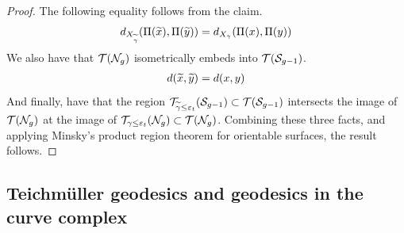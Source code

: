 \documentclass[12pt, reqno]{amsart}
\begin{document}
\begin{proof}
  The following equality follows from the claim.
  \begin{align*}
    d_{X_{\widetilde{\gamma}}}(\Pi(\widetilde{x}), \Pi(\widetilde{y})) = d_{X_{{\gamma}}}(\Pi({x}), \Pi({y}))
  \end{align*}
  We also have that $\mathcal{T}(\mathcal{N}_g)$ isometrically embeds into $\mathcal{T}(\mathcal{S}_{g-1})$.
  \begin{align*}
    d(\widetilde{x}, \widetilde{y}) = d(x, y)
  \end{align*}
  And finally, have that the region $\mathcal{T}_{\widetilde{\gamma} \leq \varepsilon_t}(\mathcal{S}_{g-1}) \subset \mathcal{T}(\mathcal{S}_{g-1})$ intersects the image of $\mathcal{T}(\mathcal{N}_g)$ at the image of $\mathcal{T}_{\gamma \leq \varepsilon_t}(\mathcal{N}_g) \subset \mathcal{T}(\mathcal{N}_g)$.
  Combining these three facts, and applying Minsky's product region theorem for orientable surfaces, the result follows.
\end{proof}


\subsection{Teichmüller geodesics and geodesics in the curve complex}
\label{sec:dist-form-teichm}
\end{document}
